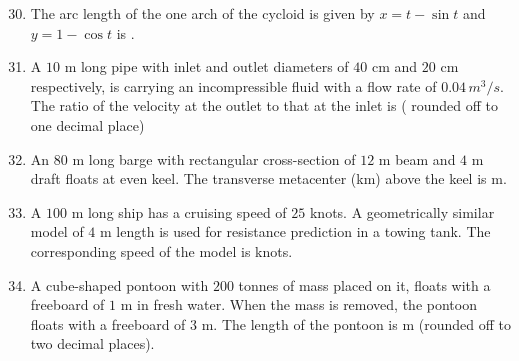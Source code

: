 \documentclass[journal]{IEEEtran}
\theoremstyle{remark}
\begin{document}
\begin{enumerate}[itemsep=1em]
\setcounter{enumi}{29}
\item The arc length of the one arch of the cycloid is given by $x=t-\sin t$ and $y=1-\cos t$ is \underline{\hspace{3cm}}.

\end{enumerate}

\begin{enumerate}[itemsep=1em]
\setcounter{enumi}{30}
\item A $10$ m long pipe with inlet and outlet diameters of $40$ cm and $20$ cm respectively, is carrying an incompressible fluid with a flow rate of $0.04\, m^3/s$. The ratio of the velocity at the outlet to that at the inlet is \underline{\hspace{2cm}}( rounded off to one decimal place) 
\end{enumerate}

\newpage
\vspace*{0.25cm}

\begin{enumerate}[itemsep=1em]
\setcounter{enumi}{31}
\item An $80$ m long barge with rectangular cross-section of $12$ m beam and $4$ m draft floats at even keel. The transverse metacenter (km) above the keel is \underline{\hspace{2cm}} m. 
\end{enumerate}

\begin{enumerate}[itemsep=1em]
\setcounter{enumi}{32}
\item A $100$ m long ship has a cruising speed of $25$ knots. A geometrically similar model of $4$ m length is used for resistance prediction in a towing tank. The corresponding speed of the model is \underline{\hspace{2cm}} knots. 
\end{enumerate}

\begin{enumerate}[itemsep=1em]
\setcounter{enumi}{33}
\item A cube-shaped pontoon with $200$ tonnes of mass placed on it, floats with a freeboard of $1$ m in fresh water. When the mass is removed, the pontoon floats with a freeboard of $3$ m. The length of the pontoon is \underline{\hspace{2cm}} m (rounded off to two decimal places).
\end{enumerate}
\end{document}

